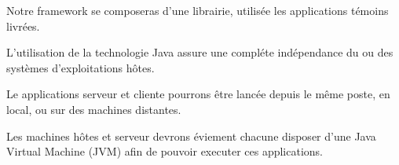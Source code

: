 \documentclass[10pt,a4paper]{article}
\begin{document}
Notre framework se composeras d'une librairie, utilisée les applications témoins livrées.

L'utilisation de la technologie Java assure une compléte indépendance du ou des systèmes d'exploitations hôtes.

Le applications serveur et cliente pourrons être lancée depuis le même poste, en local, ou sur des machines distantes.

Les machines hôtes et serveur devrons éviement chacune disposer d'une Java Virtual Machine (JVM) afin de pouvoir executer ces applications.
\end{document}

